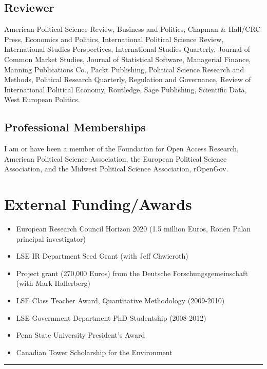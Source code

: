 \documentclass[a4paper]{article}
\begin{document}
\subsection*{Reviewer}

American Political Science Review, Business and Politics, Chapman \& Hall/CRC Press, Economics and Politics,
International Political Science Review, International Studies Perspectives,
International Studies Quarterly,
Journal of Common Market Studies, Journal of Statistical Software,
Managerial Finance, Manning Publications Co.,
Packt Publishing, Political Science Research and Methods, Political Research
Quarterly, Regulation and Governance, Review of International Political Economy,
Routledge, Sage Publishing, Scientific Data, West European Politics.

\subsection*{Professional Memberships}

I am or have been a member of the Foundation for Open Access Research, American Political Science Association, the European Political Science Association, and the Midwest Political Science Association, rOpenGov.

\section*{External Funding/Awards}

\begin{itemize}

    \item European Research Council Horizon 2020 (1.5 million Euros, Ronen Palan principal investigator)
    \item LSE IR Department Seed Grant (with Jeff Chwieroth)
    \item Project grant (270,000 Euros) from the Deutsche Forschungsgemeinschaft (with Mark Hallerberg)
    \item LSE Class Teacher Award, Quantitative Methodology (2009-2010)
    \item LSE Government Department PhD Studentship (2008-2012)
    \item Penn State University President's Award
    \item Canadian Tower Scholarship for the Environment

\end{itemize}

\vspace{0.5cm}
\medskip\hrule height 1pt
\vspace{0.5cm}
\end{document}
